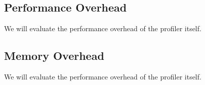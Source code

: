 
 








\subsection{Performance Overhead}
\label{sec:perf}

We will evaluate the performance overhead of the profiler itself. 

\subsection{Memory Overhead}
\label{sec:memory}

We will evaluate the performance overhead of the profiler itself. 

\begin{comment}

\subsection{Range of Allocator Metrics}
We will provide the metrics to evaluate the allocators, based on the averaged value. 
\todo{What types of metrics should we used? For instance, what type of policy should we used to exclude an allocator, and then get the value of the allocator. 20\%}
We will provide a table that can be utilized to evaluate all future allocators. 
	
\end{comment}

